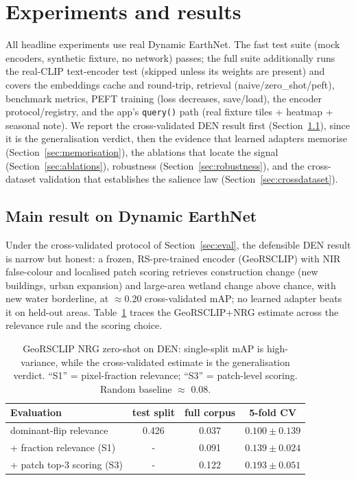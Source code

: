 \documentclass{article}
\begin{document}
\section{Experiments and results}
\label{sec:results}

All headline experiments use real Dynamic EarthNet. The fast test suite (mock
encoders, synthetic fixture, no network) passes; the full suite additionally runs
the real-CLIP text-encoder test (skipped unless its weights are present) and covers
the embeddings cache and round-trip, retrieval
(naive/zero\_shot/peft), benchmark metrics, PEFT training (loss decreases,
save/load), the encoder protocol/registry, and the app's \texttt{query()} path
(real fixture tiles + heatmap + seasonal note). We report the cross-validated DEN
result first (Section~\ref{sec:denmain}), since it is the generalisation verdict,
then the evidence that learned adapters memorise (Section~\ref{sec:memorisation}),
the ablations that locate the signal (Section~\ref{sec:ablations}), robustness
(Section~\ref{sec:robustness}), and the cross-dataset validation that establishes
the salience law (Section~\ref{sec:crossdataset}).

\subsection{Main result on Dynamic EarthNet}
\label{sec:denmain}

Under the cross-validated protocol of Section~\ref{sec:eval}, the defensible DEN
result is narrow but honest: a frozen, RS-pre-trained encoder (GeoRSCLIP) with
NIR false-colour and localised patch scoring retrieves construction change (new
buildings, urban expansion) and large-area wetland change above chance, with new
water borderline, at $\approx$0.20 cross-validated mAP; no learned adapter beats
it on held-out areas. Table~\ref{tab:cv} traces the GeoRSCLIP+NRG estimate across
the relevance rule and the scoring choice.

\begin{table}[H]
    \centering
    \caption{GeoRSCLIP NRG zero-shot on DEN: single-split mAP is high-variance,
    while the cross-validated estimate is the generalisation verdict. ``S1'' =
    pixel-fraction relevance; ``S3'' = patch-level scoring. Random baseline
    $\approx$ 0.08.}
    \label{tab:cv}
    \begin{tabular}{lccc}
        \toprule
        \textbf{Evaluation} & \textbf{test split} & \textbf{full corpus} & \textbf{5-fold CV} \\
        \midrule
        dominant-flip relevance      & 0.426 & 0.037 & $0.100 \pm 0.139$ \\
        + fraction relevance (S1)    & -   & 0.091 & $0.139 \pm 0.024$ \\
        + patch top-3 scoring (S3)   & -   & 0.122 & $\mathbf{0.193 \pm 0.051}$ \\
        \bottomrule
    \end{tabular}
\end{table}
\end{document}
